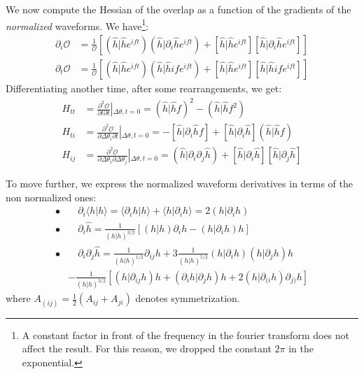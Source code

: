 \documentclass[twocolumn,showpacs,preprintnumbers,nofootinbib,prd,
superscriptaddress,10pt]{revtex4-2}
\newcommand{\scalar}[2]{\langle #1|#2 \rangle}
\newcommand{\rescalar}[2]{( #1|#2 )}
\newcommand{\imscalar}[2]{[ #1|#2 ]}
\begin{document}
We now compute the Hessian of the overlap as a function of the gradients of the {\it normalized} waveforms.
We have\footnote{
A constant factor in front of the frequency in the fourier transform does not affect the result. For this reason, we dropped the constant $2\pi$ in the exponential.}:
\begin{align}
	\partial_i \mathcal{O} &= \frac{1}{\mathcal{O}} \left[ \rescalar{\hat{h}}{\hat{h}e^{ift}}\rescalar{\hat{h}}{\partial_i\hat{h}e^{ift}} + \imscalar{\hat{h}}{\hat{h}e^{ift}}\imscalar{\hat{h}}{\partial_i\hat{h}e^{ift}} \right]\\
	\partial_t \mathcal{O} &= \frac{1}{\mathcal{O}} \left[ \rescalar{\hat{h}}{\hat{h}e^{ift}}\rescalar{\hat{h}}{\hat{h}if e^{ift}} + \imscalar{\hat{h}}{\hat{h}e^{ift}}\imscalar{\hat{h}}{\hat{h}if e^{ift}} \right]
\end{align}
Differentiating another time, after some rearrangements, we get:
\begin{align}
H_{tt} &= \frac{\partial^2 \mathcal{O}}{\partial t \partial t } \left|_{\Delta\theta, t = 0} \right.
								= \rescalar{\hat{h}}{\hat{h}f}^2 - \rescalar{\hat{h}}{\hat{h}f^2} \label{eq:H_tt}\\
H_{ti} &= \frac{\partial^2 \mathcal{O}}{\partial \Delta \theta_i \partial t } \left|_{\Delta\theta, t = 0} \right.
								= - \imscalar{\hat{h}}{\partial_i \hat{h}f} + \imscalar{\hat{h}}{\partial_i\hat{h}} \rescalar{\hat{h}}{\hat{h}f} \label{eq:H_ti}\\
H_{ij} &= \frac{\partial^2 \mathcal{O}}{\partial \Delta \theta_i \partial \Delta \theta_j }\left|_{\Delta\theta, t = 0} \right.
								= \rescalar{\hat{h}}{\partial_i\partial_j\hat{h}} +\imscalar{\hat{h}}{\partial_i\hat{h}} \imscalar{\hat{h}}{\partial_j\hat{h}} \label{eq:H_ij}
\end{align}

To move further, we express the normalized waveform derivatives in terms of the non normalized ones:
\begin{align*}
	\bullet&\quad \partial_i \scalar{h}{h} = \scalar{\partial_i h}{h}+ \scalar{h}{\partial_i h} = 2 \rescalar{h}{\partial_i h} \\
	\bullet&\quad \partial_i \hat{h} =\frac{1}{\rescalar{h}{h}^{3/2}} \left[ \rescalar{h}{h}\partial_i h -  \rescalar{h}{\partial_i h} h \right]	\\
	\bullet &\quad \partial_i \partial_j \hat{h} = \frac{1}{\rescalar{h}{h}^{1/2}} \partial_{ij}h 	+3 \frac{1}{\rescalar{h}{h}^{5/2}} \rescalar{h}{\partial_i h}\rescalar{h}{\partial_j h}h \\
	&- \frac{1}{\rescalar{h}{h}^{3/2}} \left[\rescalar{h}{ \partial_{ij} h} h + \rescalar{\partial_i h}{\partial_j h}  h
		+2\rescalar{h}{\partial_{(i} h} \partial_{j)} h \right]
\end{align*}
where $A_{(ij)} = \frac{1}{2}(A_{ij}+A_{ji})$ denotes symmetrization.
\end{document}
